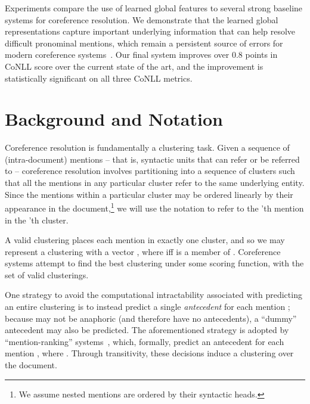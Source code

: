 \documentclass[11pt,letterpaper]{article}
\begin{document}
Experiments compare the use of learned global features to several
strong baseline systems for coreference resolution. We demonstrate that the
learned global representations capture important underlying information that can help
resolve difficult pronominal mentions, which remain a persistent source of  errors for modern coreference systems~\cite{DandK:13,KandK:13,wiseman15learning,martschat15latent}. Our final system improves over 0.8 points in CoNLL score over the current state of the art, and the improvement is statistically significant on all three CoNLL metrics.
 
\section{Background and Notation}
Coreference resolution is fundamentally a clustering task. Given a
sequence  of (intra-document) mentions -- that is, syntactic units that can refer or be referred to --
coreference resolution involves partitioning  into a sequence
of clusters  such that all the mentions in any
particular cluster  refer to the same underlying
entity. Since the mentions within a particular cluster may be ordered
linearly by their appearance in the document,\footnote{We assume
  nested mentions are ordered by their syntactic heads.} we will use
the notation  to refer to the 'th mention in the 'th
cluster.

A valid clustering places each mention in exactly one cluster, and so
we may represent a clustering with a vector , where  iff  is a
member of . Coreference systems attempt to
find the best clustering  under some scoring
function, with  the set of valid clusterings.

One strategy to avoid the computational intractability associated with predicting an entire clustering  is to instead predict a single \textit{antecedent} for each mention ; because  may not be anaphoric (and therefore have no antecedents), a ``dummy'' antecedent  may also be predicted. The aforementioned strategy is adopted by ``mention-ranking'' systems~\cite{DandB:08,RandN:09,DandK:13}, which, formally, predict an antecedent  for each mention , where . Through transitivity, these decisions induce a clustering over the document.
\end{document}
